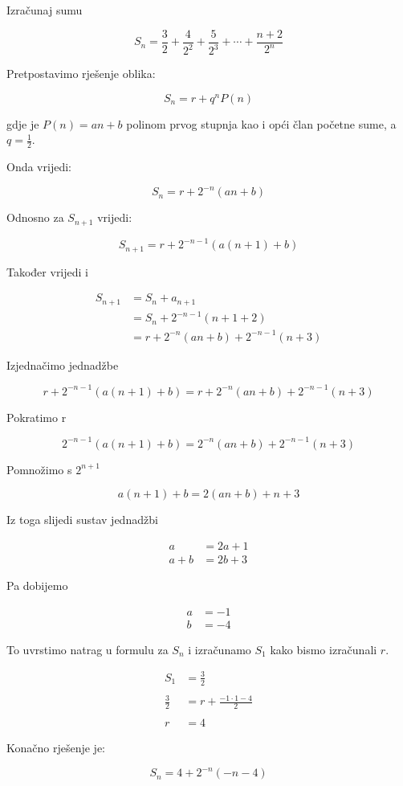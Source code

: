 \documentclass{article}
\begin{document}
	Izračunaj sumu
	
	\[ S_n = \frac{3}{2} + \frac{4}{2^2} + \frac{5}{2^3} + \cdots + \frac{n+2}{2^n} \]
	
	Pretpostavimo rješenje oblika:
	
	\[ S_n = r + q^n P(n) \]
	
	gdje je \( P(n) = an + b \) polinom prvog stupnja kao i opći član početne sume, a \( q = \frac{1}{2} \).
	
	Onda vrijedi:
	
	\[ S_n = r + 2^{-n} (an + b) \]
	
	Odnosno za \( S_{n+1} \) vrijedi:
	
	\[ S_{n + 1} = r + 2^{-n-1} (a(n + 1) + b) \]
	
	Također vrijedi i
	
	\begin{align*}
		S_{n + 1} &= S_n + a_{n + 1} \\
		&= S_n + 2^{-n - 1} (n + 1 + 2)  \\
		&= r + 2^{-n} (an + b) + 2^{-n-1} (n + 3) 
	\end{align*}
	
	Izjednačimo jednadžbe
	
	\[ r + 2^{-n-1} (a(n + 1) + b) = r + 2^{-n} (an + b) + 2^{-n-1} (n + 3) \]
	
	Pokratimo r
	
	\[ 2^{-n-1} (a(n + 1) + b) = 2^{-n} (an + b) + 2^{-n-1} (n + 3) \]
	
	Pomnožimo s \( 2^{n+1} \)
	
	\[ a(n + 1) + b = 2 (an + b) +  n + 3 \]
	
	Iz toga slijedi sustav jednadžbi
	
	\begin{align*}
		a &= 2a + 1 \\
		a + b &= 2b + 3
	\end{align*}
	
	Pa dobijemo 
	
	\begin{align*}
		a &= -1 \\
		b &= -4
	\end{align*}
	
	To uvrstimo natrag u formulu za \( S_n \) i izračunamo \( S_1 \) kako bismo izračunali \( r \).
	
	\begin{align*}
		S_1 &= \frac{3}{2} \\ 
		\\
		\frac{3}{2} &= r + \frac{-1 \cdot 1 - 4}{2} \\
		\\	
		r &= 4
	\end{align*}
	
	Konačno rješenje je:
	
	\[ S_n = 4 + 2^{-n} (-n -4) \]
\end{document}
